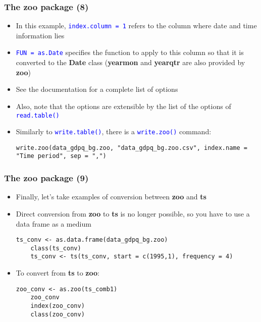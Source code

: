 \documentclass[10pt]{beamer}
\newcommand{\cc}[1]{\texttt{\textcolor{blue}{#1}}}
\theoremstyle{definition}
\begin{document}
\begin{frame}[fragile]
\frametitle{The \textbf{zoo} package (8)}
\begin{itemize}
	\item In this example, \cc{index.column = 1} refers to the column where date and time information lies
	\item \cc{FUN = as.Date} specifies the function to apply to this column so that it is converted to the \textbf{Date} class (\textbf{yearmon} and \textbf{yearqtr} are also provided by \textbf{zoo})
	\item See the documentation for a complete list of options
	\item Also, note that the options are extensible by the list of the options of \cc{read.table()}
	\item Similarly to \cc{write.table()}, there is a \cc{write.zoo()} command:
	\begin{lstlisting}[style = rstyle, breaklines]
	write.zoo(data_gdpq_bg.zoo, "data_gdpq_bg.zoo.csv", index.name = "Time period", sep = ",")
	\end{lstlisting}
\end{itemize}
\end{frame}

\begin{frame}[fragile]
\frametitle{The \textbf{zoo} package (9)}
\begin{itemize}
	\item Finally, let's take examples of conversion between \textbf{zoo} and \textbf{ts}
	\item Direct conversion from \textbf{zoo} to \textbf{ts} is no longer possible, so you have to use a data frame as a medium
	
	\begin{lstlisting}[style = rstyle, breaklines]
	ts_conv <- as.data.frame(data_gdpq_bg.zoo)
	class(ts_conv)
	ts_conv <- ts(ts_conv, start = c(1995,1), frequency = 4)
	\end{lstlisting}
	
	\item To convert from \textbf{ts} to \textbf{zoo}:
	
	\begin{lstlisting}[style = rstyle, breaklines]
	zoo_conv <- as.zoo(ts_comb1)
	zoo_conv
	index(zoo_conv)
	class(zoo_conv)
	\end{lstlisting}
\end{itemize}
\end{frame}
\end{document}
